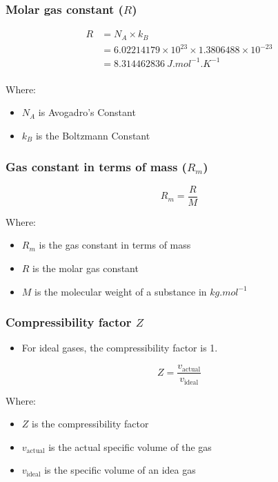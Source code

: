 \documentclass[11pt]{article}
\begin{document}
\subsubsection{Molar gas constant (\(R\))}
\label{sec:org8e3f463}
\begin{align*}
R &= N_A \times k_B \\
&= 6.02214179 \times 10^{23} \times 1.3806488 \times 10^{-23} \\
&= \qty{8.314462836}{J.mol^{-1}.K^{-1}} \\
\end{align*}

Where:
\begin{itemize}
\item \(N_A\) is Avogadro's Constant
\item \(k_B\) is the Boltzmann Constant
\end{itemize}

\subsubsection{Gas constant in terms of mass (\(R_m\))}
\label{sec:orgca3df44}
\[R_m = \frac{R}{M}\]

Where:
\begin{itemize}
\item \(R_m\) is the gas constant in terms of mass
\item \(R\) is the molar gas constant
\item \(M\) is the molecular weight of a substance in \(\unit{kg.mol^{-1}}\)
\end{itemize}

\subsubsection{Compressibility factor \(Z\)}
\label{sec:org6318443}
\begin{itemize}
\item For ideal gases, the compressibility factor is 1.
\end{itemize}

\[Z = \frac{v_{\text{actual}}}{v_{\text{ideal}}}\]

Where:
\begin{itemize}
\item \(Z\) is the compressibility factor
\item \(v_{\text{actual}}\) is the actual specific volume of the gas
\item \(v_{\text{ideal}}\) is the specific volume of an idea gas
\end{itemize}
\end{document}
